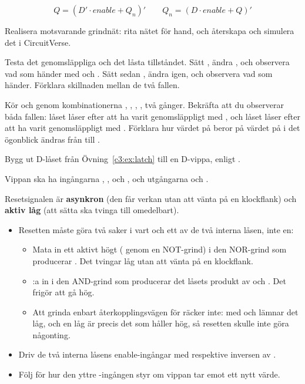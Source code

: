 \[ Q = (D' \cdot \mathit{enable} + Q_n)' \qquad Q_n = (D \cdot \mathit{enable} + Q)' \]

 Realisera motsvarande grindnät: rita nätet för hand, och återskapa och simulera det i
CircuitVerse.

 Testa det genomsläppliga och det låsta tillståndet. Sätt , ändra
, och observera vad som händer med  och . Sätt sedan ,
ändra  igen, och observera vad som händer. Förklara skillnaden mellan de två fallen.

 Kör  och  genom kombinationerna , , ,
, två gånger. Bekräfta att du observerar båda fallen: låset låser efter att ha varit
genomsläppligt med , och låset låser efter att ha varit genomsläppligt med
. Förklara hur värdet på  beror på värdet på  i det ögonblick
 ändras från  till .


\label{c3:ex:dff}
Bygg ut D-låset från Övning~\ref{c3:ex:latch} till en D-vippa, enligt .

Vippan ska ha ingångarna , ,  och , och utgångarna
 och .

Resetsignalen är \textbf{asynkron} (den får verkan utan att vänta på en klockflank) och
\textbf{aktiv låg} (att sätta  ska tvinga  till  omedelbart).

\begin{itemize}
  \item Resetten måste göra två saker i vart och ett av de två interna låsen, inte en:
  \begin{itemize}
    \item Mata in ett aktivt högt  ( genom en NOT-grind) i den NOR-grind
      som producerar . Det tvingar  låg utan att vänta på en klockflank.
    \item {}:a in  i den AND-grind som producerar det låsets produkt av
       och . Det frigör  att gå hög.
    \item Att grinda enbart återkopplingsvägen för  räcker inte: med  och
       lämnar det  låg, och en låg  är precis det som håller 
      hög, så resetten skulle inte göra någonting.
  \end{itemize}
  \item Driv de två interna låsens enable-ingångar med  respektive inversen av
    .
  \item Följ  för hur den yttre -ingången styr om vippan tar emot
    ett nytt värde.
\end{itemize}

